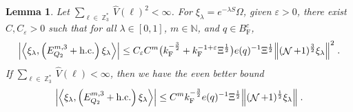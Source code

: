 \documentclass[12pt,a4paper]{article}
\numberwithin{equation}{section}
\newcommand{\NNN}{\mathbb{N}}
\newcommand{\1}{\mathbb{I}}
\newcommand{\F}{\mathrm{F}}
\DeclareMathOperator{\Z}{\mathbb{Z}}
\DeclareMathOperator{\NN}{\mathcal{N}}
\newcommand{\half}{\frac{1}{2}}
\newcommand{\eva}[1]{\left\langle #1 \right\rangle}
\theoremstyle{plain}
\newtheorem{lemma}[theorem]{Lemma}
\theoremstyle{definition}
\theoremstyle{remark}
\theoremstyle{plain}
\theoremstyle{definition}
\theoremstyle{remark}
\begin{document}
\begin{lemma} \label{lem:EQ215}
Let $ \sum_{\ell \in \Z_3^*} \hat{V}(\ell)^2 < \infty $. For $\xi_\lambda = e^{-\lambda S} \Omega$, given $ \varepsilon > 0 $, there exist $ C, C_\varepsilon > 0 $ such that for all $ \lambda \in [0,1] $, $ m \in \NNN $, and $ q \in B_{\F}^c $,
\begin{equation} \label{eq:estEQ215_Coulomb}
\begin{aligned}
	\abs{\eva{\xi_\lambda,\left(E^{m,3}_{Q_2}+\mathrm{h.c.}\right) \xi_\lambda }}\nonumber
	\leq C_\varepsilon C^m \big( k_{\F}^{-\frac 32}
		+ k_{\F}^{-1 + \varepsilon} \Xi^\half \big)
		e(q)^{-1} \Xi^{\half}
		\norm{(\NN+1)^{\frac 32} \xi_\lambda }^2 \;.
\end{aligned}
\end{equation}
If $ \sum_{\ell \in \Z_3^*} \hat{V}(\ell) < \infty $, then we have the even better bound
\begin{equation} \label{eq:estEQ215}
\begin{aligned}
	\abs{\eva{\xi_\lambda,\left(E^{m,3}_{Q_2}+\mathrm{h.c.}\right) \xi_\lambda }}\nonumber
	\leq C^m k_{\F}^{-\frac{3}{2}} e(q)^{-1} \Xi^{\half}
		\norm{(\NN+1)^\half \xi_\lambda } \;.
\end{aligned}
\end{equation}
\end{lemma}
\end{document}
